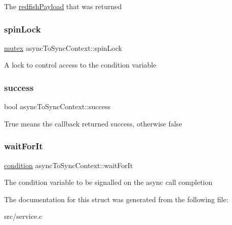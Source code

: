 The \hyperlink{structredfishPayload}{redfish\+Payload} that was returned \mbox{\label{structasyncToSyncContext_aa6966a3a59c87af9a5daa94ce34e07dd}} 
\subsubsection{\texorpdfstring{spin\+Lock}{spinLock}}
{\footnotesize\ttfamily \hyperlink{queue_8h_a8c80af1d72030a9dc70c3a2c3e46ae9a}{mutex} async\+To\+Sync\+Context\+::spin\+Lock}

A lock to control access to the condition variable \mbox{\label{structasyncToSyncContext_a3629d45e7c35e218a5b98cfafde25b44}} 
\subsubsection{\texorpdfstring{success}{success}}
{\footnotesize\ttfamily bool async\+To\+Sync\+Context\+::success}

True means the callback returned success, otherwise false \mbox{\label{structasyncToSyncContext_a6c09d06e275e2063e31bd9b79fa0c221}} 
\subsubsection{\texorpdfstring{wait\+For\+It}{waitForIt}}
{\footnotesize\ttfamily \hyperlink{queue_8h_a18a0de1af5a8524b75bf94d6b14701b4}{condition} async\+To\+Sync\+Context\+::wait\+For\+It}

The condition variable to be signalled on the async call completion 

The documentation for this struct was generated from the following file\+:\begin{DoxyCompactItemize}
\item 
src/service.\+c\end{DoxyCompactItemize}
